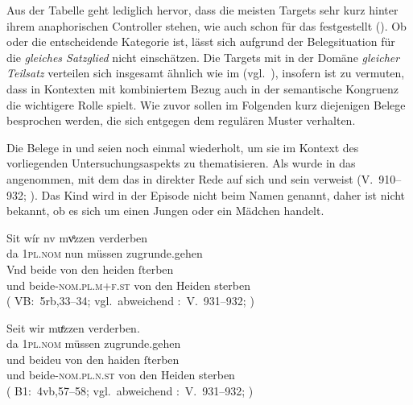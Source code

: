 Aus der Tabelle geht lediglich hervor, dass die meisten Targets sehr kurz
hinter ihrem anaphorischen Controller stehen, wie auch schon für das
\CAO{} festgestellt (). Ob  oder
 die entscheidende Kategorie ist, lässt sich aufgrund der
Belegsituation für die  \emph{gleiches Satzglied} nicht
einschätzen. Die Targets mit  in der Domäne \emph{gleicher
Teilsatz} verteilen sich insgesamt ähnlich wie im
\CAO{} (vgl.~), insofern ist zu vermuten, dass in
Kontexten mit kombiniertem Bezug auch in der \KC{} semantische
Kongruenz die wichtigere Rolle spielt. Wie zuvor
sollen im Folgenden kurz diejenigen Belege besprochen werden, die sich entgegen
dem regulären Muster verhalten.

Die Belege in  und  seien noch einmal
wiederholt, um sie im Kontext des vorliegenden Unter\-suchungsaspekts zu
thematisieren. Als  wurde in  das
   angenommen, mit dem das 
 in direkter Rede auf sich und sein  
verweist (V.~910--932; \cite[98]{schroeder1895}). Das Kind wird in der Episode
nicht beim Namen genannt, daher ist nicht bekannt, ob es sich um einen Jungen
oder ein Mädchen handelt.

\begin{exe}
\ex \label{ex:wipkindelin2}
	\begin{xlist}
	\ex \label{ex:wipkindelin2_1}
		\gll Sit wír nv mvͤzzen verderben \\
			da \textsc{1pl\tsub{\SF/\SX}.nom} nun müssen zugrunde.gehen \\
	\sn \gll Vnd beide von den heiden ſterben \\
			und beide-\textsc{nom.pl.m+f\tsub{\SF/\SX}.st} von den Heiden
				sterben \\
		\trans {}
			(%
				VB:~5rb,33--34; vgl.~abweichend
				\KC:~V.~931--932;
				\cite[98]{schroeder1895}%
			)
		
	\ex \label{ex:wipkindelin2_2}
		\gll Seit wir muͤzzen verderben. \\
			da \textsc{1pl\tsub{\SF/\SX}.nom} müssen zugrunde.gehen \\
	\sn \gll und beideu von den haiden ſterben \\
			und beide-\textsc{nom.pl.n\tsub{\SF/\SX}.st} von den Heiden
				sterben \\
		\trans {}
			(%
				B1:~4vb,57--58; vgl.~abweichend
				\KC:~V.~931--932;
				\cite[98]{schroeder1895}%
			)
	\end{xlist}%
\end{exe}

